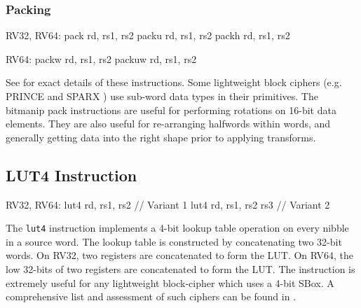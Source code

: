 
\subsubsection{Packing}

\begin{cryptobitmanipisa}
RV32, RV64: 
    pack   rd, rs1, rs2
    packu  rd, rs1, rs2
    packh  rd, rs1, rs2

RV64: 
    packw  rd, rs1, rs2
    packuw rd, rs1, rs2
\end{cryptobitmanipisa}

See \cite[Section 2.1.4]{riscv:bitmanip:draft} for exact details of
these instructions.
Some lightweight block ciphers
(e.g.
PRINCE \cite{block:prince}
and
SPARX \cite{DPUVGB:16}) use
sub-word data types in their primitives.
The bitmanip pack instructions are useful for performing rotations on
16-bit data elements.
They are also useful for re-arranging halfwords within words, and
generally getting data into the right shape prior to applying transforms.




\subsection{LUT4 Instruction}

\begin{cryptoisa}
RV32, RV64:
    lut4    rd, rs1, rs2      // Variant 1
    lut4    rd, rs1, rs2 rs3  // Variant 2
\end{cryptoisa}

The {\tt lut4} instruction implements a 4-bit lookup table operation
on every nibble in a source word.
The lookup table is constructed by concatenating two 32-bit words.
On RV32, two \XLEN registers are concatenated to form the LUT.
On RV64, the low 32-bits of two \XLEN registers are concatenated to form
the LUT.
The instruction is extremely useful for any lightweight block-cipher
which uses a 4-bit SBox.
A comprehensive list and assessment of such ciphers can be found
in \cite{TGMGD:19}.

